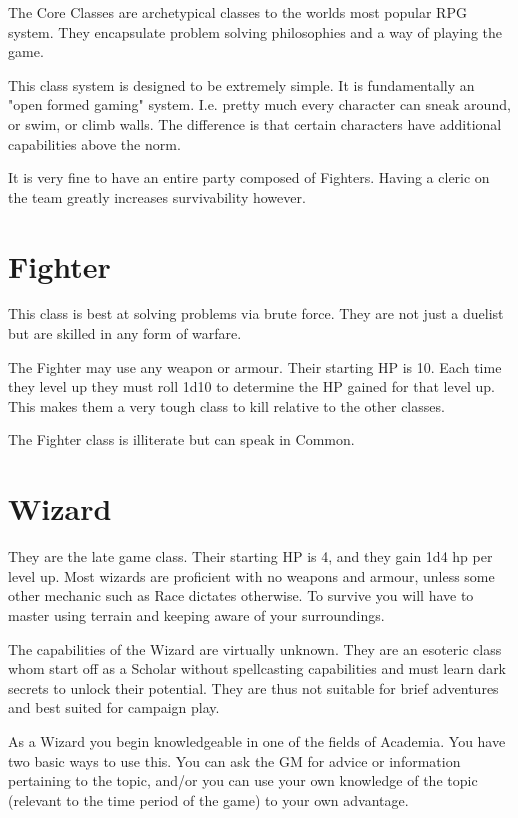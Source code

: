 \begin{multicols}{2}
The Core Classes are archetypical classes to the worlds most popular RPG system. They encapsulate problem solving philosophies and a way of playing the game. 

This class system is designed to be extremely simple. It is fundamentally an "open formed gaming" system. I.e. pretty much every character can sneak around, or swim, or climb walls. The difference is that certain characters have additional capabilities above the norm. 

It is very fine to have an entire party composed of Fighters. Having a cleric on the team greatly increases survivability however. 

\section{Fighter} This class is best at solving problems via brute force. They are not just a duelist but are skilled in any form of warfare. 

The Fighter may use any weapon or armour. Their starting HP is 10. Each time they level up they must roll 1d10 to determine the HP gained for that level up. This makes them a very tough class to kill relative to the other classes.

The Fighter class is illiterate but can speak in Common.  

\section{Wizard} They are the late game class. Their starting HP is 4, and they gain 1d4 hp per level up. Most wizards are proficient with no weapons and armour, unless some other mechanic such as Race dictates otherwise. To survive you will have to master using terrain and keeping aware of your surroundings. 

The capabilities of the Wizard are virtually unknown. They are an esoteric class whom start off as a Scholar without spellcasting capabilities and must learn dark secrets to unlock their potential. They are thus not suitable for brief adventures and best suited for campaign play.

As a Wizard you begin knowledgeable in one of the fields of Academia. You have two basic ways to use this. You can ask the GM for advice or information pertaining to the topic, and/or you can use your own knowledge of the topic (relevant to the time period of the game) to your own advantage. 


\end{multicols}

